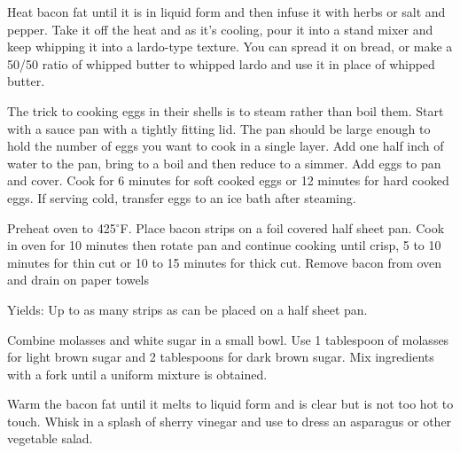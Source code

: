 \documentclass[letterpaper]{recipePMG}
\renewcommand{\deg}{$^\circ$}
\begin{document}


Heat bacon fat until it is in liquid form and then infuse it with herbs or salt and pepper. Take it off the heat and as it's cooling, pour it into a stand mixer and keep whipping it into a lardo-type texture. You can spread it on bread, or make a 50/50 ratio of whipped butter to whipped lardo and use it in place of whipped butter.


\label{SoftHardEggs}

The trick to cooking eggs in their shells is to steam rather than boil them. Start with a sauce pan with a tightly fitting lid. The pan should be large enough to hold the number of eggs you want to cook in a single layer.  Add one half inch of water to the pan, bring to a boil and then reduce to a simmer.  Add eggs to pan and cover.  Cook for 6 minutes for soft cooked eggs or 12 minutes for hard cooked eggs. If serving cold, transfer eggs to an ice bath after steaming.



Preheat oven to 425\deg F. Place bacon strips on a foil covered half sheet pan. Cook in oven for 10 minutes then rotate pan and continue cooking until crisp, 5 to 10 minutes for thin cut or 10 to 15 minutes for thick cut. Remove bacon from oven and drain on paper towels

Yields: Up to as many strips as can be placed on a half sheet pan.



\label{BrownSugar}


Combine molasses and white sugar in a small bowl. Use 1 tablespoon of molasses for light brown sugar and 2 tablespoons for dark brown sugar. Mix ingredients with a fork until a uniform mixture is obtained.


\label{BaconFatVinaigrette}


Warm the bacon fat until it melts to liquid form and is clear but is not too hot to touch.  Whisk in a splash of sherry vinegar and use to dress an asparagus or other vegetable salad.
\end{document}

